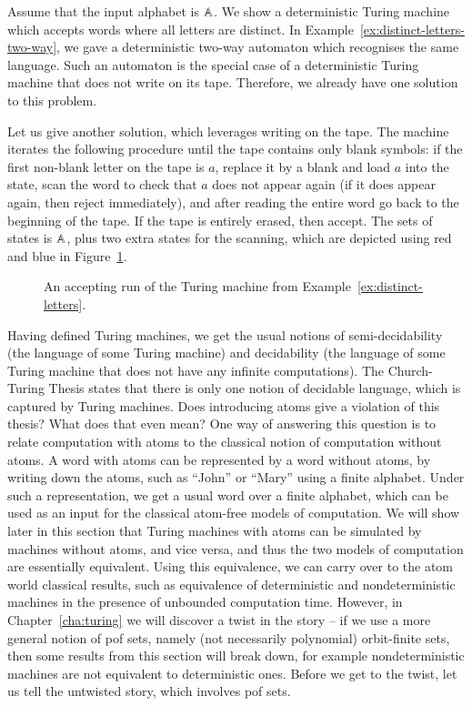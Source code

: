 \begin{myexample}\label{ex:distinct-letters} 
		Assume that the input alphabet is $\mathbb A$. 	We show a deterministic Turing machine which accepts words where all letters are distinct. In Example~\ref{ex:distinct-letters-two-way}, we gave a deterministic two-way automaton which recognises the same language. Such an automaton is the special case of a deterministic Turing machine that does not write on its tape. Therefore, we already have one solution to this problem. 

		Let us give another solution, which leverages writing on the tape. 
		The  machine iterates the following procedure until the tape contains only blank symbols: if the first non-blank letter on the tape is $a$, replace it by a blank and load $a$ into the state, scan the word to check that $a$ does not appear again (if it does appear again, then reject immediately), and after reading the entire word go back to the beginning of the tape. If the tape is entirely erased, then accept. The sets of states is $\mathbb A$, plus two extra states for the scanning, which are depicted using red and blue in Figure~\ref{fig:distinct-turing}. 
\begin{figure}
\caption{\label{fig:distinct-turing}An accepting run of the Turing machine from Example~\ref{ex:distinct-letters}.}
\end{figure}
\end{myexample}

Having defined Turing machines, we get the usual notions of semi-decidability (the language of some Turing machine) and decidability (the language of some Turing machine that  does not have any infinite computations).
The Church-Turing Thesis states that there is only one notion of decidable language, which is captured by Turing machines. Does introducing atoms give a violation of this thesis? What does that even mean? One way of answering this question is to relate computation with atoms to the classical notion of computation without atoms. A word with atoms can be represented by a word without atoms, by writing down the atoms, such as ``John'' or ``Mary'' using a finite alphabet. Under such a representation, we  get a usual word over a finite alphabet, which can be used as an input for the classical atom-free models of computation. We will show later in this section that Turing machines with atoms can be simulated by machines without atoms, and vice versa, and thus the two models of computation are essentially equivalent. Using this equivalence, we can carry over to the atom world classical results, such as equivalence of deterministic and nondeterministic machines in the presence of unbounded computation time. However, in  Chapter~\ref{cha:turing} we will discover a twist in the story -- if we use a more general notion of pof sets, namely (not necessarily polynomial) orbit-finite sets, then some results from this section will break down, for example nondeterministic machines are not equivalent to deterministic ones. Before we get to the twist, let us tell the untwisted story, which involves pof sets. 

